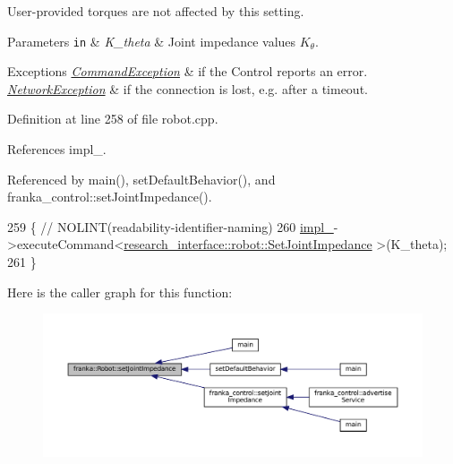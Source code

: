 User-\/provided torques are not affected by this setting.


\begin{DoxyParams}[1]{Parameters}
\mbox{\tt in}  & {\em K\+\_\+theta} & Joint impedance values $K_{\theta}$.\\
\hline
\end{DoxyParams}

\begin{DoxyExceptions}{Exceptions}
{\em \hyperlink{structfranka_1_1CommandException}{Command\+Exception}} & if the Control reports an error. \\
\hline
{\em \hyperlink{structfranka_1_1NetworkException}{Network\+Exception}} & if the connection is lost, e.\+g. after a timeout. \\
\hline
\end{DoxyExceptions}


Definition at line 258 of file robot.\+cpp.



References impl\+\_\+.



Referenced by main(), set\+Default\+Behavior(), and franka\+\_\+control\+::set\+Joint\+Impedance().


\begin{DoxyCode}
259                                         \{  \textcolor{comment}{// NOLINT(readability-identifier-naming)}
260   \hyperlink{classfranka_1_1Robot_aca155054184e5b6478942fd6a1b82ba4}{impl\_}->executeCommand<\hyperlink{structresearch__interface_1_1robot_1_1SetJointImpedance}{research\_interface::robot::SetJointImpedance}
      >(K\_theta);
261 \}
\end{DoxyCode}
Here is the caller graph for this function\+:
\nopagebreak
\begin{figure}[H]
\begin{center}
\leavevmode
\includegraphics[width=350pt]{classfranka_1_1Robot_aa18a28697cf6e3be16c6cff2dd839560_icgraph}
\end{center}
\end{figure}
\mbox{\label{classfranka_1_1Robot_ad1cf59d1b11306d80cd3c7144a989c56}} 
